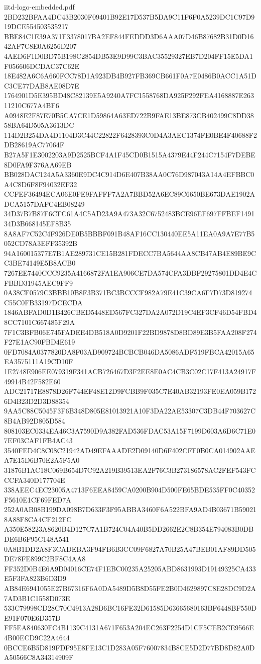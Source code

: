 \begin{filecontents*}[overwrite]{iitd-logo-embedded.pdf}
2BD232BFAA4DC43B2030F09401B92E17D537B5DA9C11F6F0A5239DC1C97D919DCE554503535217
BBE84C1E39A371F3378017BA2EF844FEDDD3D6AAA07D46B87682B31D0D1642AF7C8E0A6256D207
4AED6F1D0BD75B198C2854DB53E9D99C3BAC35529327EB7D204FF15E5DA1F056606DCDAC37C62E
18E482A6C6A660FCC78D1A923DB4B927FB369CB661F0A7E0486B0ACC1A51DC3CE77DAB8AE08D7E
1764901D5E395BD48C82139E5A9240A7FC1558768DA925F292FEA4168887E26311210C677A4BF6
A0948E2F87E70B5CA7CE1D59864A63ED722B9FAE13BE873CB402499C8DD3858BA64D505A3613DC
114D2B254DA4D1104D3C44C22822F6428393C0D4A3AEC1374FE0BE4F40688F2DB28619AC77064F
B27A5F1E3002203A9D2525BCF4A1F45CD0B1515A4379E44F244C7154F7DEBE8D0FA9F376AA69EB
BB028DAC124A5A3360E9DC4C914D6E407B38AA0C76D987043A14A4EFBBC0A4C8D6F8F94032EF32
CCFEF36494ECA06E0FE9FAFFF7A2A7BBD52A6EC89C6650BE673DAE1902ADCA5157DAFC4EB08249
34D37B7B87F6CFC61A4C5AD23A9A473A32C6752483BCE96EF697FFBEF149134D3B668145EF8B35
8A8AF7C52C4F926DE0B5BBBF091B48AF16CC130440EE5A11EA0A9A7E77B5052CD78A3EFF35392B
94A160015377E7B1AE289731CE15B281FDECC7BA5644AA8CB47AB4E89BE9CC3BE74149E5B8ACB0
7267EE7440CCC9235A4166872FA1EA906CE7DA574CFA3DBF29275801DD4E4CFBBD31945AEC9FF9
0A38CF0579C3BBB10B8F3B371BC3BCCCF982A79E41C39CA6F7D73D819274C55C0FB33197DCECDA
1846ABFAD0D1B426CBED5448ED567FC327DA2A072D19C4EF3CF46D54FBD48CC7101C667485F29A
7F1C3BFB06E745FADEE4DB518A0D9201F22BD9878D8BD89E3B5FAA208F274F27E1AC90FBD4E619
0FD7084A0377820DA8F03AD909724BCBCB046DA5086ADF519FBCA42015A65EA3575111A19CD10F
1E2748E906EE079319F341ACB726467D3F2EE8E0AC4CB3C02C17F413A24917F49914B42F582E60
ADC21717E8878D26F744EF48E12D9FCBB9F035C7E40AB32193FE0EA059B1726D4B23D2D3D88354
9AA5C88C5045F3F6B348D805E81013921A10F3DA22AE53307C3DB44F703627C8B4AB92D805D584
808103EC0334EA46C3A7590D9A382FAD536FDAC53A15F7199D603A6D6C71E07EF03CAF1FB4AC43
3540FED4C8C08C21942AD49EFAAADE2D09140D6F402CFF0B0CA014902AAEA7E15D6B70E2A5F5A0
31876B1AC18C069B654D7C92A219B39513EA2F76C3B273186578AC2FEF543FCCCFA340D177704E
338AEEC4EC23005A4713F6EEA8459CA0200B904D500FE65BDE535FF0C40352F5610E1CF69FED7A
252A0AB08B199DA098B7D633F3F95ABBA3460F6A522BFA9AD4B03671B590218A88F8CA4CF212FC
A350E58223A8620B4D127C7A1B724C04A40B5DD2662E2C8B354E794083B0DBDE6B6F95C148A541
0A8B1DD2A8F3CADEBA3F94FB6B3CC09F6827A70B25A47BEB01AF89DD505DE78FE899C2BF8C4AA8
FF352D0B4E6A9D04016CE74F1EBC00235A25205ABD8631993D19149325CA433E5F3FA823B6D3D9
AB84E6941055E27B67316F6A0DA5489D5B8D55FE2B0D4629897C8E28DC9D2A7AD3B1C1558D073E
533C79998CD28C70C4913A28D6BC16FE32D61585D63665680163BF6448BF550DE91F070E6D357D
FF5EA840630FC4B1139C4131A671F653A204EC263F2254D1CF5CEB2CE9566E4B00ECD9C22A4644
0BCCE6B5D819FDF95E8FE13C1D283A05F76007834B8CE5D2D77BD8D82A0DA50566C8A34314909F

\end{filecontents*}
